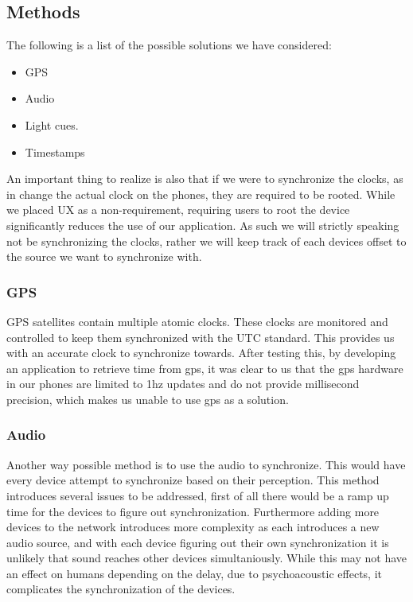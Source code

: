 \subsection{Methods}
The following is a list of the possible solutions we have considered:
\begin{itemize}
    \item GPS
    \item Audio
    \item Light cues.
    \item Timestamps
\end{itemize}
An important thing to realize is also that if we were to synchronize the clocks, as in change the actual clock on the phones, they are required to be rooted.
While we placed \ac{UX} as a non-requirement, requiring users to root the device significantly reduces the use of our application.
As such we will strictly speaking not be synchronizing the clocks, rather we will keep track of each devices offset to the source we want to synchronize with.


\subsubsection{GPS}
GPS satellites contain multiple atomic clocks.
These clocks are monitored and controlled to keep them synchronized with the UTC standard.
This provides us with an accurate clock to synchronize towards.
After testing this, by developing an application to retrieve time from gps, it was clear to us that the gps hardware in our phones are limited to 1hz updates and do not provide millisecond precision, which makes us unable to use gps as a solution.
\subsubsection{Audio}
Another way possible method is to use the audio to synchronize.
This would have every device attempt to synchronize based on their perception.
This method introduces several issues to be addressed, first of all there would be a ramp up time for the devices to figure out synchronization.
Furthermore adding more devices to the network introduces more complexity as each introduces a new audio source, and with each device figuring out their own synchronization it is unlikely that sound reaches other devices simultaniously.
While this may not have an effect on humans depending on the delay, due to psychoacoustic effects, it complicates the synchronization of the devices.
